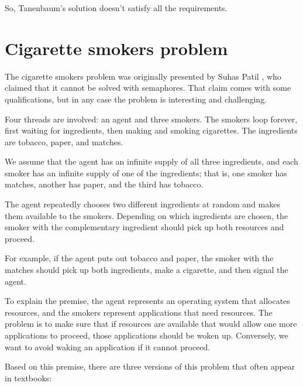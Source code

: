 \documentclass{book}
\newcommand{\clearemptydoublepage}{\newpage\cleardoublepage}
\begin{document}
So, Tanenbaum's solution doesn't satisfy all the requirements.




\clearemptydoublepage
\section {Cigarette smokers problem}

The cigarette smokers problem was originally presented by
Suhas Patil \cite{patil}, who claimed that it cannot be solved with
semaphores.  That claim comes with some qualifications, but in
any case the problem is interesting and challenging.

Four threads are involved: an agent and three smokers.  The smokers
loop forever, first waiting for ingredients, then making and smoking
cigarettes.  The ingredients are tobacco, paper, and matches.

We assume that the agent has an infinite supply of all three
ingredients, and each smoker has an infinite supply of one of
the ingredients; that is, one smoker has matches, another has
paper, and the third has tobacco.

The agent repeatedly chooses two different ingredients at random
and makes them available to the smokers.  Depending on which
ingredients are chosen, the smoker with the complementary ingredient
should pick up both resources and proceed.

For example, if the agent puts out tobacco and paper, the
smoker with the matches should pick up both ingredients, make
a cigarette, and then signal the agent.

To explain the premise, the agent represents an operating system that
allocates resources, and the smokers represent applications that need
resources.  The problem is to make sure that if resources are
available that would allow one more applications to proceed,
those applications should be woken up.  Conversely, we want to avoid
waking an application if it cannot proceed.



Based on this premise, there are three versions of this problem
that often appear in textbooks:
\end{document}
